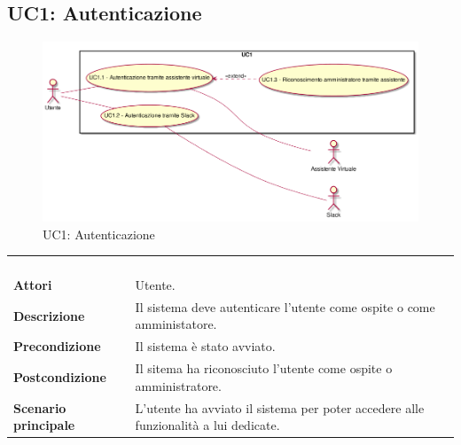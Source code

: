 \newpage\subsection{UC1: Autenticazione}
\label{UC1}
\begin{figure}[h]
	\centering
	\includegraphics[width=\textwidth,height=\textheight,keepaspectratio]{images/UseCaseUC1.png}
	\caption{UC1: Autenticazione}
\end{figure}
\begin{longtable}{l|p{10cm}}
	\rowcolor[gray]{0.8} \multicolumn{2}{c}{} \\
	\rowcolor[gray]{0.8} \multicolumn{2}{c}{\textbf{UC1 - Autenticazione}} \\
	\rowcolor[gray]{0.8} \multicolumn{2}{c}{} \\
	\hline
	&\\
	\textbf{Attori} & Utente.\\[7pt]
	\textbf{Descrizione} & Il sistema deve autenticare l'utente come ospite o come amministatore.\\[7pt]
	\textbf{Precondizione} & Il sistema è stato avviato.\\[7pt]
	\textbf{Postcondizione} & Il sitema ha riconosciuto l'utente come ospite o amministratore.\\[7pt]
	\textbf{Scenario principale} &L'utente ha avviato il sistema per poter accedere alle funzionalità a lui dedicate.\\[7pt]\hline
\end{longtable}

